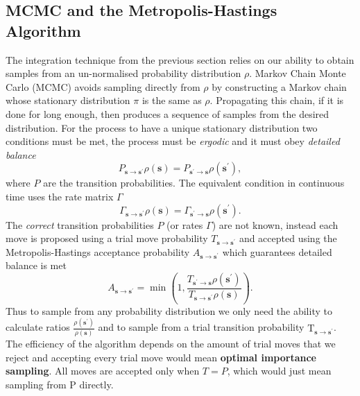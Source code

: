 \subsection{MCMC and the Metropolis-Hastings Algorithm}
\label{subsec:Impl-MCMC}
The integration technique from the previous section relies on our ability to obtain samples from an un-normalised probability distribution $\rho$. Markov Chain Monte Carlo (MCMC) avoids sampling directly from $\rho$ by constructing a Markov chain whose stationary distribution $\pi$ is the same as $\rho$. Propagating this chain, if it is done for long enough, then produces a sequence of samples from the desired distribution. For the process to have a unique stationary distribution two conditions must be met, the process must be \emph{ergodic} and it must obey \emph{detailed balance}
\begin{equation}
	P_{\mathbf{s \rightarrow \mathbf{s}^\prime}}\rho(\mathbf{s}) = P_{\mathbf{s^\prime \rightarrow \mathbf{s}}} \rho(\mathbf{s}^\prime),
\end{equation}
where $P$ are the transition probabilities. The equivalent condition in continuous time uses the rate matrix $\Gamma$
\begin{equation}
	\Gamma_{\mathbf{s \rightarrow \mathbf{s}^\prime}}\rho(\mathbf{s}) = \Gamma_{\mathbf{s^\prime \rightarrow \mathbf{s}}} \rho(\mathbf{s}^\prime).
\end{equation}
The \emph{correct} transition probabilities $P$ (or rates $\Gamma$) are not known, instead each move is proposed using a trial move probability $T_{\mathbf{s \rightarrow \mathbf{s}^\prime}}$ and accepted using the Metropolis-Hastings acceptance probability $A_{\mathbf{s \rightarrow \mathbf{s}^\prime}}$ which guarantees detailed balance is met
\begin{equation}
	A_{\mathbf{s \rightarrow \mathbf{s}^\prime}} = \min \left(1, \frac{T_{\mathbf{s^\prime \rightarrow \mathbf{s}}} \rho(\mathbf{s}^\prime)}{
		T_{\mathbf{s \rightarrow \mathbf{s}^\prime}}\rho(\mathbf{s})}\right).
\end{equation} 
Thus to sample from any probability distribution we only need the ability to calculate ratios $\frac{\rho(\boldsymbol{s}^{\prime})}{\rho(\boldsymbol{s})}$ and to sample from a trial transition probability $\mathrm T_{\mathbf{s \rightarrow \mathbf{s}^\prime}}$. The efficiency of the algorithm depends on the amount of trial moves that we reject and accepting every trial move would mean \textbf{optimal importance sampling}. All moves are accepted only when $T = P$, which would just mean sampling from $\mathrm P$ directly. 

